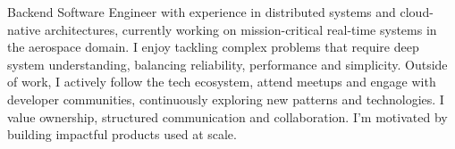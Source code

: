 

\begin{cvparagraph}

Backend Software Engineer with experience in distributed systems and cloud-native architectures, currently working on mission-critical real-time systems in the aerospace domain.
I enjoy tackling complex problems that require deep system understanding, balancing reliability, performance and simplicity.
Outside of work, I actively follow the tech ecosystem, attend meetups and engage with developer communities, continuously exploring new patterns and technologies.
I value ownership, structured communication and collaboration. I'm motivated by building impactful products used at scale.
\end{cvparagraph}